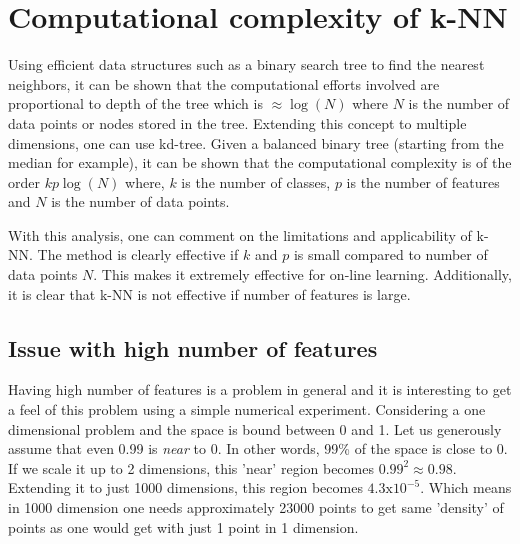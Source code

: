 \documentclass{article}
\begin{document}
\section{Computational complexity of k-NN}
Using efficient data structures such as a binary search tree to find the nearest neighbors, it can be shown that the computational efforts involved are proportional to depth of the tree which is $\approx \log(N)$ where $N$ is the number of data points or nodes stored in the tree. Extending this concept to multiple dimensions, one can use kd-tree. Given a balanced binary tree (starting from the median for example), it can be shown that the computational complexity is of the order $kp\log(N)$ where, $k$ is the number of classes, $p$ is the number of features and $N$ is the number of data points. 

With this analysis, one can comment on the limitations and applicability of k-NN. The method is clearly effective if $k$ and $p$ is small compared to number of data points $N$. This makes it extremely effective for on-line learning. Additionally, it is clear that k-NN is not effective if number of features is large. 

\subsection{Issue with high number of features}
Having high number of features is a problem in general and it is interesting to get a feel of this problem using a simple numerical experiment. Considering a one dimensional problem and the space is bound between 0 and 1. Let us generously assume that even 0.99 is \textit{near} to 0. In other words, 99\% of the space is close to 0. If we scale it up to 2 dimensions, this 'near' region becomes $\mathrm{0.99^2} \approx \mathrm{0.98}$.  Extending it to just 1000 dimensions, this region becomes $\mathrm{4.3 x 10^{-5}}$. Which means in 1000 dimension one needs approximately 23000 points to get same 'density' of points as one would get with just 1 point in 1 dimension.
\end{document}
